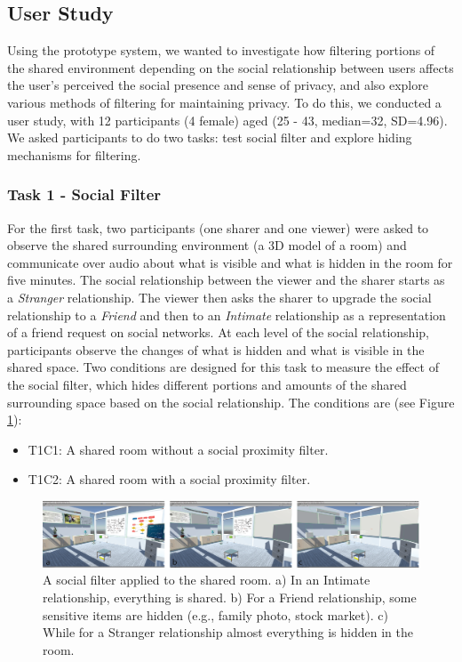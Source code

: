 \subsection{User Study}

Using the prototype system, we wanted to investigate how filtering portions of the shared environment depending on the social relationship between users affects the user's perceived the social presence and sense of privacy, and also explore various methods of filtering for maintaining privacy. To do this, we conducted a user study, with 12 participants (4 female) aged (25 - 43, median=32, SD=4.96). 
We asked participants to do two tasks: test social filter and explore hiding mechanisms for filtering.

\subsubsection{Task 1 - Social Filter}

For the first task, two participants (one sharer and one viewer) were asked to observe the shared surrounding environment (a 3D model of a room) and communicate over audio about what is visible and what is hidden in the room for five minutes. The social relationship between the viewer and the sharer starts as a \textit{Stranger} relationship. The viewer then asks the sharer to upgrade the social relationship to a \textit{Friend} and then to an \textit{Intimate} relationship as a representation of a friend request on social networks. At each level of the social relationship, participants observe the changes of what is hidden and what is visible in the shared space. Two conditions are designed for this task to measure the effect of the social filter, which hides different portions and amounts of the shared surrounding space based on the social relationship. The conditions are (see Figure \ref{fig:frontier18:social-filter}): 

\begin{itemize}
\item T1C1: A shared room without a social proximity filter.
\item T1C2: A shared room with a social proximity filter. 
\end{itemize}

\begin{figure}
    \begin{center}
    \includegraphics[width=\linewidth]{images/54-hiding-frontier18/images-02.png}
    \caption{A social filter applied to the shared room. a) In an Intimate relationship, everything is shared. b) For a Friend relationship, some sensitive items are hidden (e.g., family photo, stock market). c) While for a Stranger relationship almost everything is hidden in the room.}
    \label{fig:frontier18:social-filter}
    \end{center}
\end{figure}

